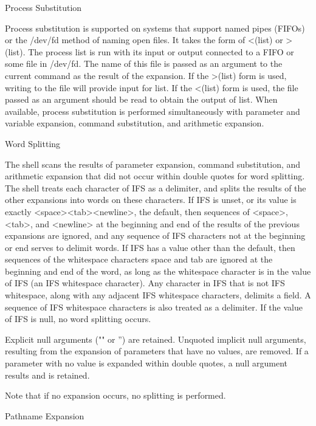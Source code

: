 \documentclass[11pt]{article}
\begin{document}
{{{Process Substitution

Process substitution is supported on systems that support named pipes (FIFOs) or the /dev/fd method of naming open files. It takes the form of <(list) or >(list). The process list is run with its input or output connected to a FIFO or some file in /dev/fd. The name of this file is passed as an argument to the current command as the result of the expansion. If the >(list) form is used, writing to the file will provide input for list. If the <(list) form is used, the file passed as an argument should be read to obtain the output of list.
When available, process substitution is performed simultaneously with parameter and variable expansion, command substitution, and arithmetic expansion.

Word Splitting

The shell scans the results of parameter expansion, command substitution, and arithmetic expansion that did not occur within double quotes for word splitting.
The shell treats each character of IFS as a delimiter, and splits the results of the other expansions into words on these characters. If IFS is unset, or its value is exactly <space><tab><newline>, the default, then sequences of <space>, <tab>, and <newline> at the beginning and end of the results of the previous expansions are ignored, and any sequence of IFS characters not at the beginning or end serves to delimit words. If IFS has a value other than the default, then sequences of the whitespace characters space and tab are ignored at the beginning and end of the word, as long as the whitespace character is in the value of IFS (an IFS whitespace character). Any character in IFS that is not IFS whitespace, along with any adjacent IFS whitespace characters, delimits a field. A sequence of IFS whitespace characters is also treated as a delimiter. If the value of IFS is null, no word splitting occurs.

Explicit null arguments ("" or '') are retained. Unquoted implicit null arguments, resulting from the expansion of parameters that have no values, are removed. If a parameter with no value is expanded within double quotes, a null argument results and is retained.

Note that if no expansion occurs, no splitting is performed.

Pathname Expansion

}}}
\end{document}
